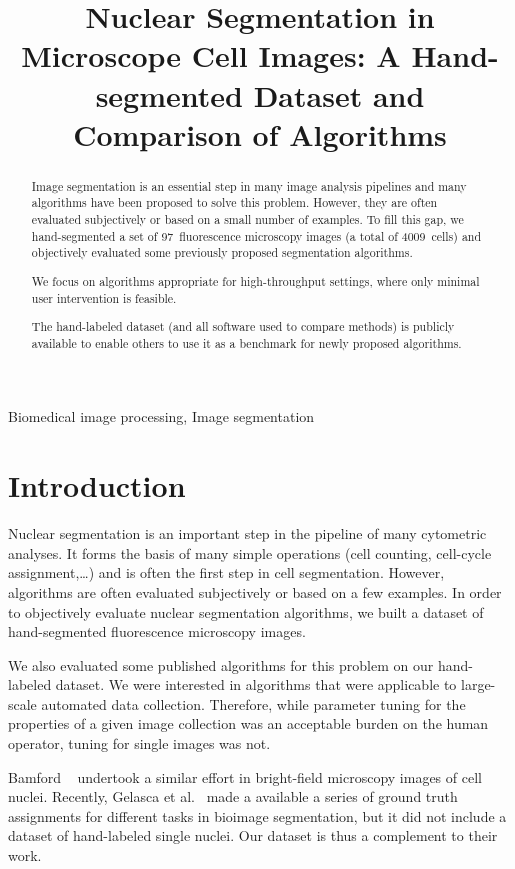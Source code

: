 \documentclass{article}
\title{Nuclear Segmentation in Microscope Cell Images: A Hand-segmented Dataset and Comparison of Algorithms}
\begin{document}
\maketitle
%
\begin{abstract}
Image segmentation is an essential step in many image analysis pipelines and many algorithms have been proposed to solve this problem. However, they are often evaluated subjectively or based on a small number of examples. To fill this gap, we hand-segmented a set of 97~fluorescence microscopy images (a total of 4009~cells) and objectively evaluated some previously proposed segmentation algorithms.

We focus on algorithms appropriate for high-throughput settings, where only minimal user intervention is feasible.

The hand-labeled dataset (and all software used to compare methods) is publicly available to enable others to use it as a benchmark for newly proposed algorithms.
\end{abstract}
%
\begin{keywords}
Biomedical image processing, Image segmentation
\end{keywords}
%
\section{Introduction}\label{sec:intro}

Nuclear segmentation is an important step in the pipeline of many cytometric analyses. It forms the basis of many simple operations (cell counting, cell-cycle assignment,\ldots) and is often the first step in cell segmentation. However, algorithms are often evaluated subjectively or based on a few examples. In order to objectively evaluate nuclear segmentation algorithms, we built a dataset of hand-segmented fluorescence microscopy images.

We also evaluated some published algorithms for this problem on our hand-labeled dataset. We were interested in algorithms that were applicable to large-scale automated data collection. Therefore, while parameter tuning for the properties of a given image collection was an acceptable burden on the human operator, tuning for single images was not.

Bamford ~\cite{Bamford2003Empirical} undertook a similar effort in bright-field microscopy images of cell nuclei.  Recently, Gelasca et al.~\cite{Gelasca08-298} made a available a series of ground truth assignments for different tasks in bioimage segmentation, but it did not include a dataset of hand-labeled single nuclei. Our dataset is thus a complement to their work.
\end{document}
